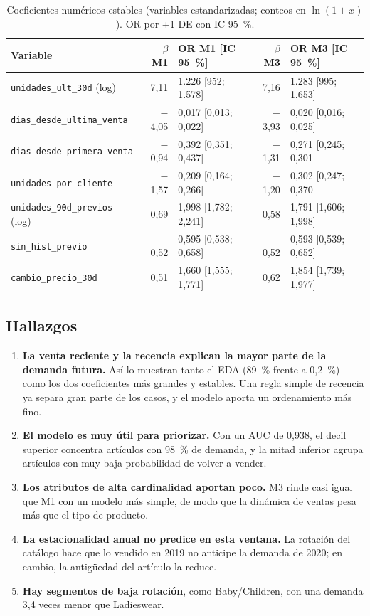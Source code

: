 \documentclass[
  journal=largetwo,
  manuscript=Laboratorio-Numero-02,
  year=2026,
  volume=1
]{cup-journal}
\begin{document}
\begin{table}[!ht]
\centering\footnotesize
\caption{Coeficientes numéricos estables (variables estandarizadas; conteos en $\ln(1+x)$). OR por +1 DE con IC 95~\%.}
\label{tab:coef}
\begin{tabular}{@{}lrlrl@{}}
\toprule
Variable & $\beta$ M1 & OR M1 [IC 95~\%] & $\beta$ M3 & OR M3 [IC 95~\%] \\
\midrule
\texttt{unidades\_ult\_30d} (log) & 7,11 & 1.226 [952; 1.578] & 7,16 & 1.283 [995; 1.653] \\
\texttt{dias\_desde\_ultima\_venta} & $-$4,05 & 0,017 [0,013; 0,022] & $-$3,93 & 0,020 [0,016; 0,025] \\
\texttt{dias\_desde\_primera\_venta} & $-$0,94 & 0,392 [0,351; 0,437] & $-$1,31 & 0,271 [0,245; 0,301] \\
\texttt{unidades\_por\_cliente} & $-$1,57 & 0,209 [0,164; 0,266] & $-$1,20 & 0,302 [0,247; 0,370] \\
\texttt{unidades\_90d\_previos} (log) & 0,69 & 1,998 [1,782; 2,241] & 0,58 & 1,791 [1,606; 1,998] \\
\texttt{sin\_hist\_previo} & $-$0,52 & 0,595 [0,538; 0,658] & $-$0,52 & 0,593 [0,539; 0,652] \\
\texttt{cambio\_precio\_30d} & 0,51 & 1,660 [1,555; 1,771] & 0,62 & 1,854 [1,739; 1,977] \\
\bottomrule
\end{tabular}
\end{table}

\subsection{Hallazgos}

\begin{enumerate}
\item \textbf{La venta reciente y la recencia explican la mayor parte de la demanda futura.} Así lo muestran tanto el EDA (89~\% frente a 0,2~\%) como los dos coeficientes más grandes y estables. Una regla simple de recencia ya separa gran parte de los casos, y el modelo aporta un ordenamiento más fino.
\item \textbf{El modelo es muy útil para priorizar.} Con un AUC de 0,938, el decil superior concentra artículos con 98~\% de demanda, y la mitad inferior agrupa artículos con muy baja probabilidad de volver a vender.
\item \textbf{Los atributos de alta cardinalidad aportan poco.} M3 rinde casi igual que M1 con un modelo más simple, de modo que la dinámica de ventas pesa más que el tipo de producto.
\item \textbf{La estacionalidad anual no predice en esta ventana.} La rotación del catálogo hace que lo vendido en 2019 no anticipe la demanda de 2020; en cambio, la antigüedad del artículo la reduce.
\item \textbf{Hay segmentos de baja rotación}, como Baby/Children, con una demanda 3,4 veces menor que Ladieswear.
\end{enumerate}
\end{document}
